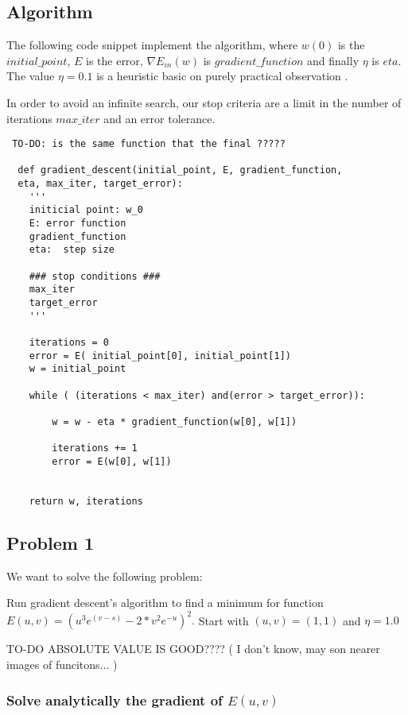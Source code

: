 \subsection{Algorithm}

The following code snippet implement the algorithm, where $w(0)$ is the $initial\_point$, $E$ is the error, $\nabla E_{in}(w)$ is $gradient\_function$ and
finally $\eta$ is $eta.$ The value $\eta = 0.1$ is a heuristic basic on purely practical observation \cite{LFD}.


In order to avoid an infinite search, our stop criteria are a limit in the number of iterations $max\_iter$ and an error tolerance. 

\begin{verbatim} TO-DO: is the same function that the final ?????

  def gradient_descent(initial_point, E, gradient_function,
  eta, max_iter, target_error):
    '''
    initicial point: w_0 
    E: error function 
    gradient_function
    eta:  step size 

    ### stop conditions ###
    max_iter
    target_error
    '''

    iterations = 0
    error = E( initial_point[0], initial_point[1])
    w = initial_point
  
    while ( (iterations < max_iter) and(error > target_error)): 

        w = w - eta * gradient_function(w[0], w[1])
        
        iterations += 1
        error = E(w[0], w[1])
 
    
    return w, iterations

\end{verbatim}

\subsection{Problem 1}

We want to solve the following problem: %

Run gradient descent's algorithm to find a minimum for
function $E(u,v) = (u^3 e^{(v-s)} - 2* v^2 e^{-u})^2.$
Start with $(u,v)=(1,1)$ and $\eta = 1.0$

TO-DO ABSOLUTE VALUE IS GOOD???? ( I don't know, may son nearer images of  funcitons... )
\subsubsection{Solve analytically the gradient of $E(u,v)$}



